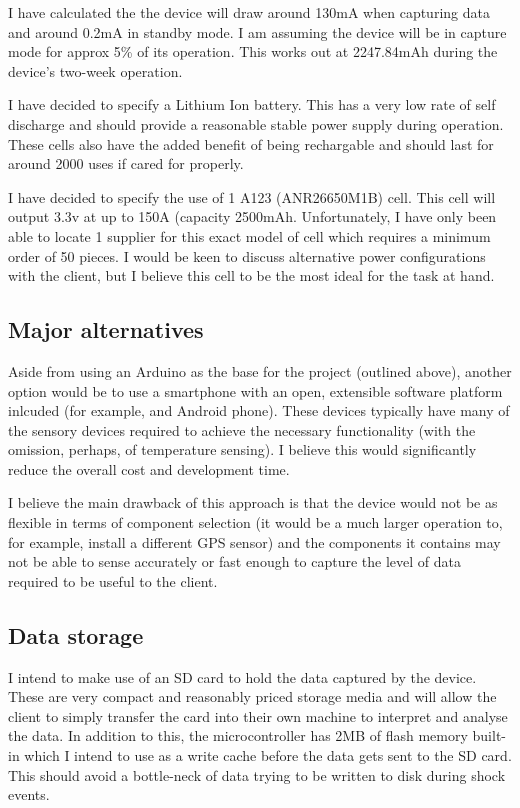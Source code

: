 \documentclass[a4paper, twoside]{article}
\begin{document}
I have calculated the the device will draw around 130mA when capturing data and
around 0.2mA in standby mode. I am assuming the device will be in capture mode
for approx 5\% of its operation. This works out at 2247.84mAh during the
device's two-week operation.

I have decided to specify a Lithium Ion battery. This has a very low rate of
self discharge and should provide a reasonable stable power supply during
operation. These cells also have the added benefit of being rechargable and
should last for around 2000 uses if cared for properly.

I have decided to specify the use of 1 A123 (ANR26650M1B) cell. This cell will output
3.3v at up to 150A (capacity 2500mAh. Unfortunately, I have only been able to
locate 1 supplier for this exact model of cell which requires a minimum order of
50 pieces. I would be keen to discuss alternative power configurations with the
client, but I believe this cell to be the most ideal for the task at hand.

\subsection{Major alternatives}
Aside from using an Arduino as the base for the project (outlined above),
another option would be to use a smartphone with an open, extensible software
platform inlcuded (for example, and Android phone). These devices typically have
many of the sensory devices required to achieve the necessary functionality
(with the omission, perhaps, of temperature sensing). I believe this would
significantly reduce the overall cost and development time.

I believe the main drawback of this approach is that the device would not be as
flexible in terms of component selection (it would be a much larger operation
to, for example, install a different GPS sensor) and the components it contains
may not be able to sense accurately or fast enough to capture the level of data
required to be useful to the client.

\subsection{Data storage}
I intend to make use of an SD card to hold the data captured by the device.
These are very compact and reasonably priced storage media and will allow the
client to simply transfer the card into their own machine to interpret and
analyse the data. In addition to this, the microcontroller has 2MB of flash
memory built-in which I intend to use as a write cache before the data gets sent
to the SD card. This should avoid a bottle-neck of data trying to be written to
disk during shock events.
\end{document}

